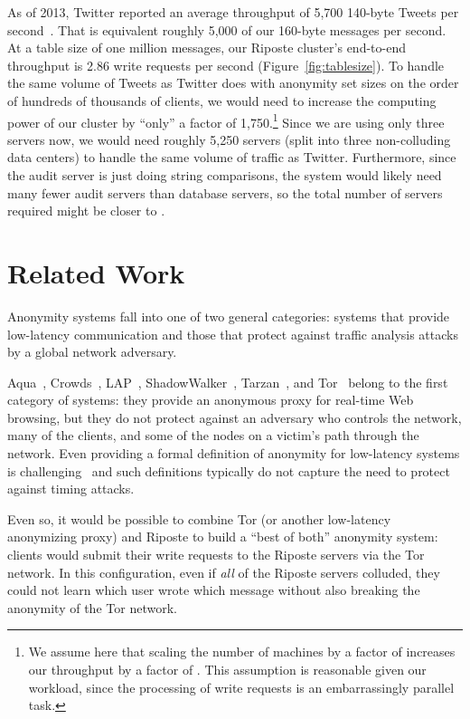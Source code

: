 \documentclass[10pt,twocolumn]{article}
\newcommand{\name}{Riposte\xspace}
\begin{document}
As of 2013, Twitter reported an average throughput of
5,700 140-byte Tweets per second~\cite{krikorian2013new}.
That is equivalent roughly 5,000 of our 160-byte messages per second.
At a table size of one million messages, our \name cluster's 
end-to-end throughput is 2.86 write requests per second (Figure~\ref{fig:tablesize}).
To handle the same volume of Tweets as Twitter does with
anonymity set sizes on the order of hundreds of thousands of clients, 
we would need to increase the computing power of our cluster by ``only''
a factor of 1,750.\footnote{
We assume here that scaling the number of machines
by a factor of  increases our throughput by a factor of .
This assumption is reasonable given our workload, since 
the processing of write requests is an embarrassingly parallel task.
}
Since we are using only three servers now, we would need
roughly 5,250 servers (split into three non-colluding data centers)
to handle the same volume of traffic as Twitter. 
Furthermore, since the audit server is just doing string comparisons,
the system would likely need many fewer audit servers than database servers,
so the total number of servers required might be closer to .

 \section{Related Work}
\label{sec:rel}

Anonymity systems fall into one of two general categories: systems that provide
low-latency communication and those that protect against traffic analysis
attacks by a global network adversary.

Aqua~\cite{leblond2013towards}, 
Crowds~\cite{reiter1998crowds}, 
LAP~\cite{hsiao2012lap}, 
ShadowWalker~\cite{mittal2009shadowwalker},
Tarzan~\cite{freedman2002tarzan}, and
Tor~\cite{dingledine2004tor} 
belong to the first category of systems: 
they provide an anonymous proxy for 
real-time Web browsing, but they
do not protect against an adversary 
who controls the network, many of
the clients, and some of the nodes
on a victim's path through the network.
Even providing a formal 
definition of anonymity for low-latency systems
is challenging~\cite{johnson2009design} and such
definitions typically do not capture the need to 
protect against timing attacks.

Even so, it would be possible to combine 
Tor (or another low-latency anonymizing proxy) and \name
to build a ``best of both'' anonymity system: clients would submit
their write requests to the \name servers via the Tor network.
In this configuration, even if {\em all} of the \name servers
colluded, they could not learn which user wrote which message
without also breaking the anonymity of the Tor network.
\end{document}
